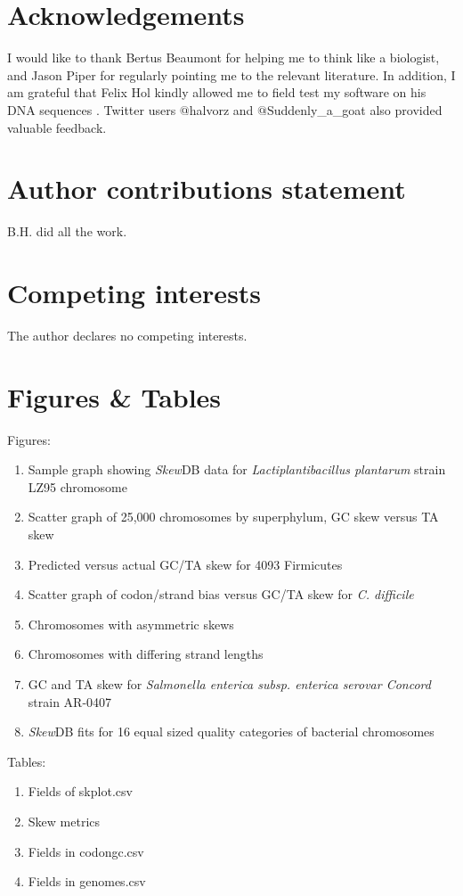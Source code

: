 \documentclass[fleqn,10pt]{wlscirep}
\begin{document}
\section*{Acknowledgements} 

I would like to thank Bertus Beaumont for helping me to think like a biologist, and Jason Piper for regularly pointing me to the relevant literature. In addition, I am grateful that Felix Hol kindly allowed me to field test my software on his DNA sequences \cite{hol_density-dependent_2016}. Twitter users $@$halvorz and $@$Suddenly\_a\_goat also provided valuable feedback.

\section*{Author contributions statement}

B.H. did all the work.

\section*{Competing interests}
The author declares no competing interests.

\section*{Figures \& Tables}
\newcommand{\comment}[1]{}

Figures:
\begin{enumerate}
\item Sample graph showing \emph{Skew}DB data for \emph{Lactiplantibacillus plantarum} strain LZ95 chromosome
\item Scatter graph of 25,000 chromosomes by superphylum, GC skew versus TA skew
\item Predicted versus actual GC/TA skew for 4093 Firmicutes
\item Scatter graph of codon/strand bias versus GC/TA skew for \emph{C. difficile}
\item Chromosomes with asymmetric skews
\item Chromosomes with differing strand lengths
\item GC and TA skew for \emph{Salmonella enterica subsp. enterica serovar Concord} strain AR-0407
\item \emph{Skew}DB fits for 16 equal sized quality categories of bacterial chromosomes
\end{enumerate}

Tables:
\begin{enumerate}
\item Fields of skplot.csv
\item  Skew metrics
\item Fields in codongc.csv
\item  Fields in genomes.csv
\end{enumerate}
\comment{
}
\end{document}
